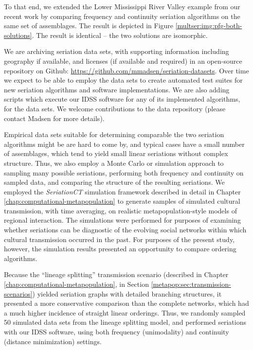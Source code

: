 To that end, we extended the Lower Mississippi River Valley example
from our recent work \citep{Lipo2015} by comparing
frequency and continuity seriation algorithms on the same set of
assemblages.  The result is
depicted in Figure \ref{multser:img:pfg-both-solutions}. The result is identical
-- the two solutions are isomorphic.  

We are archiving seriation data sets, with supporting information including geography 
if available, and licenses (if available
and required) in an open-source repository on Github:  \url{https://github.com/mmadsen/seriation-datasets}.  Over time we expect to be able to employ the data sets to create automated
test suites for new seriation algorithms and software implementations.  We are also adding scripts
which execute our IDSS software for any of its implemented algorithms, for the data sets.  We welcome 
contributions to the data repository (please contact Madsen for more details).  

Empirical data sets suitable for determining comparable the two seriation algorithms might be are hard to come by,
and typical cases have a small number of assemblages, which tend to yield small linear seriations without complex 
structure.  Thus, we also employ a Monte Carlo or simulation approach to sampling many possible seriations, 
performing both frequency and continuity on sampled data, and comparing the structure of the resulting seriations.
We employed the \emph{SeriationCT} simulation framework described in detail in Chapter \ref{chap:computational-metapopulation}
to generate samples of simulated cultural transmission, with time averaging, on realistic metapopulation-style models
of regional interaction.  The simulations were performed for purposes of examining whether seriations can be 
diagnostic of the evolving social networks within which cultural transmission occurred in the past.  For purposes
of the present study, however, the simulation results presented an opportunity to compare ordering algorithms.

Because the ``lineage splitting'' transmission scenario (described in Chapter \ref{chap:computational-metapopulation}, in Section 
\ref{metapop:sec:transmission-scenarios}) yielded seriation graphs with detailed branching structures, it presented a more 
conservative comparison than the complete networks, which had a much higher incidence of straight linear orderings.  Thus,
we randomly sampled 50 simulated data sets from the lineage splitting model, and performed seriations with our IDSS software, using both frequency (unimodality) and continuity (distance minimization) settings.




